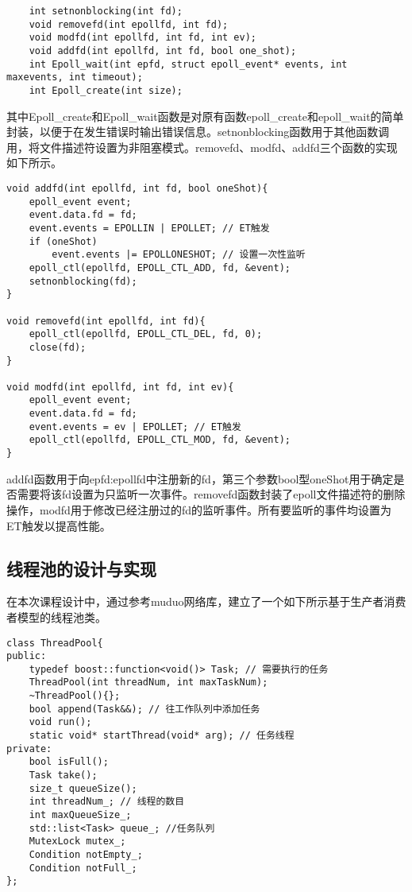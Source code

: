 \documentclass[bachelor]{thesis-uestc}
\begin{document}
\begin{lstlisting}
	int setnonblocking(int fd);
	void removefd(int epollfd, int fd);
	void modfd(int epollfd, int fd, int ev);
	void addfd(int epollfd, int fd, bool one_shot);
	int Epoll_wait(int epfd, struct epoll_event* events, int maxevents, int timeout);
	int Epoll_create(int size);
\end{lstlisting}

其中Epoll\_create和Epoll\_wait函数是对原有函数epoll\_create和epoll\_wait的简单封装，以便于在发生错误时输出错误信息。setnonblocking函数用于其他函数调用，将文件描述符设置为非阻塞模式。removefd、modfd、addfd三个函数的实现如下所示。
\begin{lstlisting}
void addfd(int epollfd, int fd, bool oneShot){
	epoll_event event;
	event.data.fd = fd;
	event.events = EPOLLIN | EPOLLET; // ET触发 
	if (oneShot)
		event.events |= EPOLLONESHOT; // 设置一次性监听 
	epoll_ctl(epollfd, EPOLL_CTL_ADD, fd, &event);
	setnonblocking(fd);
}

void removefd(int epollfd, int fd){
	epoll_ctl(epollfd, EPOLL_CTL_DEL, fd, 0);
	close(fd);
}

void modfd(int epollfd, int fd, int ev){
	epoll_event event;
	event.data.fd = fd;
	event.events = ev | EPOLLET; // ET触发 
	epoll_ctl(epollfd, EPOLL_CTL_MOD, fd, &event);
}
\end{lstlisting}

addfd函数用于向epfd:epollfd中注册新的fd，第三个参数bool型oneShot用于确定是否需要将该fd设置为只监听一次事件。removefd函数封装了epoll文件描述符的删除操作，modfd用于修改已经注册过的fd的监听事件。所有要监听的事件均设置为ET触发以提高性能。

\subsection{线程池的设计与实现}
在本次课程设计中，通过参考muduo网络库，建立了一个如下所示基于生产者消费者模型的线程池类。
\begin{lstlisting}
class ThreadPool{
public:
	typedef boost::function<void()> Task; // 需要执行的任务 
	ThreadPool(int threadNum, int maxTaskNum);
	~ThreadPool(){};
	bool append(Task&&); // 往工作队列中添加任务 
	void run();
	static void* startThread(void* arg); // 任务线程 
private:
	bool isFull();
	Task take();
	size_t queueSize();
	int threadNum_; // 线程的数目
	int maxQueueSize_;
	std::list<Task> queue_; //任务队列 
	MutexLock mutex_;
	Condition notEmpty_;
	Condition notFull_;
};
\end{lstlisting}
\end{document}
